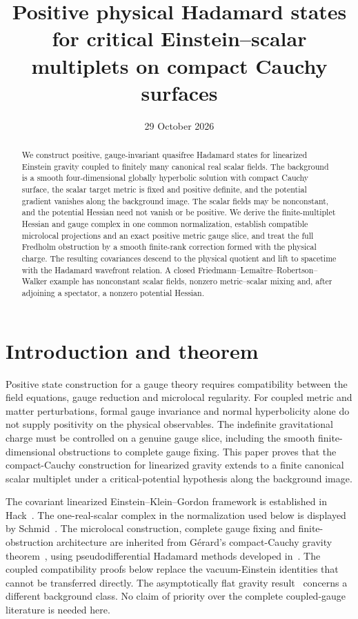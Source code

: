 \documentclass[11pt]{article}
\title{Positive physical Hadamard states for critical Einstein--scalar multiplets on compact Cauchy surfaces}
\author{}
\date{29 October 2026}
\theoremstyle{definition}
\begin{document}
\maketitle
\begin{abstract}
We construct positive, gauge-invariant quasifree Hadamard states for linearized Einstein gravity coupled to finitely many canonical real scalar fields.
The background is a smooth four-dimensional globally hyperbolic solution with compact Cauchy surface, the scalar target metric is fixed and positive definite, and the potential gradient vanishes along the background image.
The scalar fields may be nonconstant, and the potential Hessian need not vanish or be positive.
We derive the finite-multiplet Hessian and gauge complex in one common normalization, establish compatible microlocal projections and an exact positive metric gauge slice, and treat the full Fredholm obstruction by a smooth finite-rank correction formed with the physical charge.
The resulting covariances descend to the physical quotient and lift to spacetime with the Hadamard wavefront relation.
A closed Friedmann--Lema\^itre--Robertson--Walker example has nonconstant scalar fields, nonzero metric--scalar mixing and, after adjoining a spectator, a nonzero potential Hessian.
\end{abstract}

\section{Introduction and theorem}
Positive state construction for a gauge theory requires compatibility between the field equations, gauge reduction and microlocal regularity.
For coupled metric and matter perturbations, formal gauge invariance and normal hyperbolicity alone do not supply positivity on the physical observables.
The indefinite gravitational charge must be controlled on a genuine gauge slice, including the smooth finite-dimensional obstructions to complete gauge fixing.
This paper proves that the compact-Cauchy construction for linearized gravity extends to a finite canonical scalar multiplet under a critical-potential hypothesis along the background image.

The covariant linearized Einstein--Klein--Gordon framework is established in Hack~\cite{Hack2014EKG}.
The one-real-scalar complex in the normalization used below is displayed by Schmid~\cite[Section 2.2.5]{Schmid2026Thesis}.
The microlocal construction, complete gauge fixing and finite-obstruction architecture are inherited from G\'erard's compact-Cauchy gravity theorem~\cite{Gerard2024Compact}, using pseudodifferential Hadamard methods developed in~\cite{GerardWrochna2014Calculus,GerardWrochna2015YangMills,GerardOulghaziWrochna2017Geometry}.
The coupled compatibility proofs below replace the vacuum-Einstein identities that cannot be transferred directly.
The asymptotically flat gravity result~\cite{GerardMolodykWrochna2026Flat} concerns a different background class.
No claim of priority over the complete coupled-gauge literature is needed here.
\end{document}
